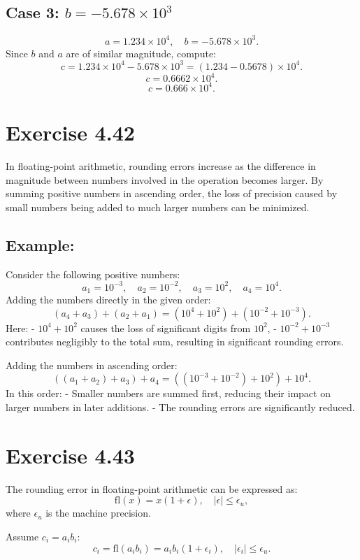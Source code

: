 \documentclass{article}
\begin{document}
\subsection{Case 3: \( b = -5.678 \times 10^3 \)}
   \[
   a = 1.234 \times 10^4, \quad b = -5.678 \times 10^3.
   \]
   Since \( b \) and \( a \) are of similar magnitude, compute:
   \[
   c = 1.234 \times 10^4 - 5.678 \times 10^3 = (1.234 - 0.5678) \times 10^4.
   \]
   \[
   c = 0.6662 \times 10^4.
   \]
   \[
   c = 0.666 \times 10^4.
   \]


\section*{Exercise 4.42}
In floating-point arithmetic, rounding errors increase as the difference in magnitude between numbers involved in the operation becomes larger. By summing positive numbers in ascending order, the loss of precision caused by small numbers being added to much larger numbers can be minimized.

\subsection{Example:}
Consider the following positive numbers:  
\[
a_1 = 10^{-3}, \quad a_2 = 10^{-2}, \quad a_3 = 10^2, \quad a_4 = 10^4.
\]
Adding the numbers directly in the given order:
\[
(a_4 + a_3) + (a_2 + a_1) = (10^4 + 10^2) + (10^{-2} + 10^{-3}).
\]
Here:
- \( 10^4 + 10^2 \) causes the loss of significant digits from \( 10^2 \),
- \( 10^{-2} + 10^{-3} \) contributes negligibly to the total sum, resulting in significant rounding errors.

Adding the numbers in ascending order:
\[
((a_1 + a_2) + a_3) + a_4 = ((10^{-3} + 10^{-2}) + 10^2) + 10^4.
\]
In this order:
- Smaller numbers are summed first, reducing their impact on larger numbers in later additions.
- The rounding errors are significantly reduced.




\section{Exercise 4.43}
The rounding error in floating-point arithmetic can be expressed as:
\[
\text{fl}(x) = x (1 + \epsilon), \quad |\epsilon| \leq \epsilon_u,
\]
where \( \epsilon_u \) is the machine precision.

Assume \( c_i = a_i b_i \):
\[
c_i = \text{fl}(a_i b_i) = a_i b_i (1 + \epsilon_i), \quad |\epsilon_i| \leq \epsilon_u.
\]
\end{document}
